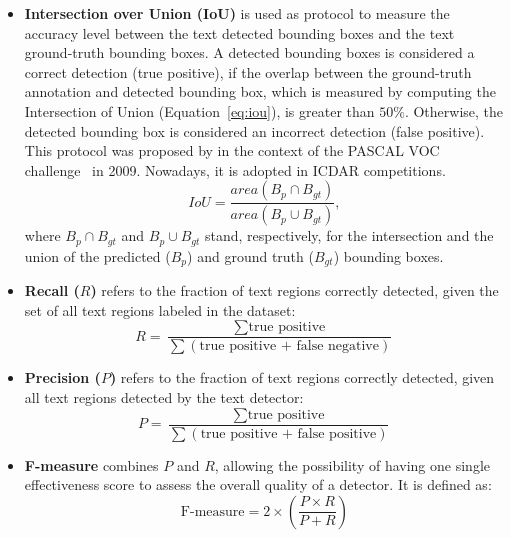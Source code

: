 \begin{itemize}
\begin{itemize}
      \item \textbf{Intersection over Union (IoU)} is used as protocol to measure the accuracy level between the text detected bounding boxes and the text ground-truth bounding boxes. 
    A detected bounding boxes is considered a correct detection (true positive), if the overlap between the ground-truth annotation and detected bounding box, which is measured by computing the Intersection of Union (Equation~\ref{eq:iou}), is greater than $50\%$. Otherwise, the detected bounding box is considered an incorrect detection (false positive). This protocol was proposed by  in the context of the PASCAL VOC challenge~\cite{Everingham2010IJCV} in 2009. Nowadays, it is adopted in ICDAR competitions.
    \begin{equation}
    IoU = \frac{area(B_p \cap B_{gt})}{area(B_p \cup B_{gt})},
    \label{eq:iou}
    \end{equation}
    where $B_p \cap B_{gt}$ and  $B_p \cup B_{gt}$ stand, respectively, for the intersection and the union of the predicted ($B_p$) and ground truth ($B_{gt}$) bounding boxes.
    \item  \textbf{Recall ($R$)} refers to the fraction of text regions correctly detected, given the set of all text regions labeled in the dataset:
    \begin{equation}
        R = \frac{\sum \textrm{true positive}}{\sum (\textrm{true positive + false negative})}
    \end{equation}
    \item  \textbf{Precision ($P$)} refers to the fraction of text regions correctly detected, given all text regions detected by the text detector:
    \begin{equation}
        P = \frac{\sum \textrm{true positive}}{\sum (\textrm{true positive + false positive})}
    \end{equation}
    \item \textbf{F-measure} combines $P$ and $R$, allowing the possibility of having one single effectiveness score to assess the overall quality of a detector. It is defined as:
    \begin{equation}
        \textrm{F-measure} = 2 \times \left( \frac{P \times R}{P + R} \right)
    \end{equation}
  
\end{itemize}



\end{itemize}
